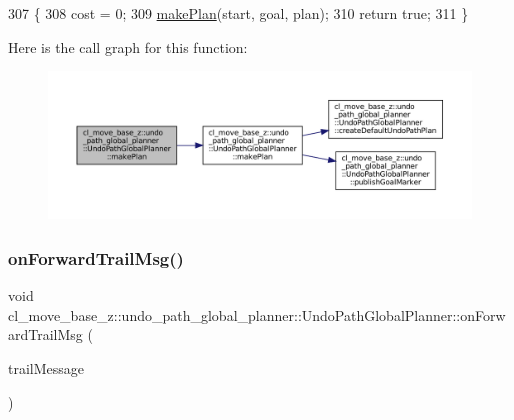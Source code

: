 \begin{DoxyCode}
307         \{
308             cost = 0;
309             \hyperlink{classcl__move__base__z_1_1undo__path__global__planner_1_1UndoPathGlobalPlanner_a46034d27c0811abae440009457a7f8b0}{makePlan}(start, goal, plan);
310             \textcolor{keywordflow}{return} \textcolor{keyword}{true};
311         \}
\end{DoxyCode}
Here is the call graph for this function\+:
\nopagebreak
\begin{figure}[H]
\begin{center}
\leavevmode
\includegraphics[width=350pt]{classcl__move__base__z_1_1undo__path__global__planner_1_1UndoPathGlobalPlanner_aca09f640e4bda4d5ccc9613276fd3f71_cgraph}
\end{center}
\end{figure}
\mbox{\label{classcl__move__base__z_1_1undo__path__global__planner_1_1UndoPathGlobalPlanner_ae5e3c5922ceb8783a6a01d904fc9c230}} 
\subsubsection{\texorpdfstring{on\+Forward\+Trail\+Msg()}{onForwardTrailMsg()}}
{\footnotesize\ttfamily void cl\+\_\+move\+\_\+base\+\_\+z\+::undo\+\_\+path\+\_\+global\+\_\+planner\+::\+Undo\+Path\+Global\+Planner\+::on\+Forward\+Trail\+Msg (\begin{DoxyParamCaption}\item[{const nav\+\_\+msgs\+::\+Path\+::\+Const\+Ptr \&}]{trail\+Message }\end{DoxyParamCaption})\hspace{0.3cm}{\ttfamily [private]}}

